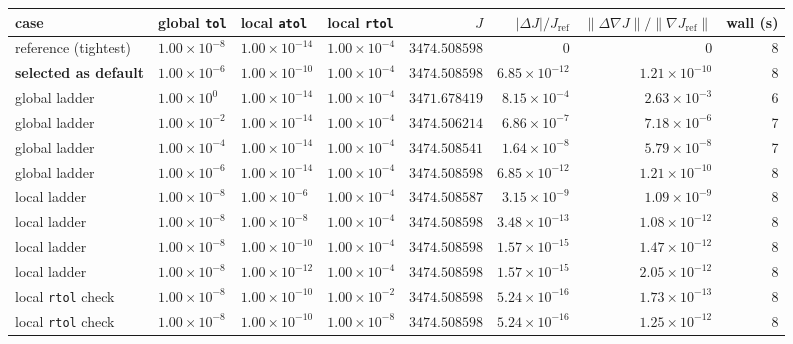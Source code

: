 \begin{tabular}{llllrrrr}
\toprule
case & global \texttt{tol} & local \texttt{atol} & local \texttt{rtol} & $J$ & $|\Delta J| / J_{\mathrm{ref}}$ & $\|\Delta \nabla J\| / \|\nabla J_{\mathrm{ref}}\|$ & wall (s) \\
\midrule
reference (tightest) & $1.00\times 10^{-8}$ & $1.00\times 10^{-14}$ & $1.00\times 10^{-4}$ & $3474.508598$ & $0$ & $0$ & 8 \\
\midrule
\textbf{selected as default} & $1.00\times 10^{-6}$ & $1.00\times 10^{-10}$ & $1.00\times 10^{-4}$ & $3474.508598$ & $6.85\times 10^{-12}$ & $1.21\times 10^{-10}$ & 8 \\
\midrule
global ladder & $1.00\times 10^{0}$ & $1.00\times 10^{-14}$ & $1.00\times 10^{-4}$ & $3471.678419$ & $8.15\times 10^{-4}$ & $2.63\times 10^{-3}$ & 6 \\
global ladder & $1.00\times 10^{-2}$ & $1.00\times 10^{-14}$ & $1.00\times 10^{-4}$ & $3474.506214$ & $6.86\times 10^{-7}$ & $7.18\times 10^{-6}$ & 7 \\
global ladder & $1.00\times 10^{-4}$ & $1.00\times 10^{-14}$ & $1.00\times 10^{-4}$ & $3474.508541$ & $1.64\times 10^{-8}$ & $5.79\times 10^{-8}$ & 7 \\
global ladder & $1.00\times 10^{-6}$ & $1.00\times 10^{-14}$ & $1.00\times 10^{-4}$ & $3474.508598$ & $6.85\times 10^{-12}$ & $1.21\times 10^{-10}$ & 8 \\
\midrule
local ladder & $1.00\times 10^{-8}$ & $1.00\times 10^{-6}$ & $1.00\times 10^{-4}$ & $3474.508587$ & $3.15\times 10^{-9}$ & $1.09\times 10^{-9}$ & 8 \\
local ladder & $1.00\times 10^{-8}$ & $1.00\times 10^{-8}$ & $1.00\times 10^{-4}$ & $3474.508598$ & $3.48\times 10^{-13}$ & $1.08\times 10^{-12}$ & 8 \\
local ladder & $1.00\times 10^{-8}$ & $1.00\times 10^{-10}$ & $1.00\times 10^{-4}$ & $3474.508598$ & $1.57\times 10^{-15}$ & $1.47\times 10^{-12}$ & 8 \\
local ladder & $1.00\times 10^{-8}$ & $1.00\times 10^{-12}$ & $1.00\times 10^{-4}$ & $3474.508598$ & $1.57\times 10^{-15}$ & $2.05\times 10^{-12}$ & 8 \\
\midrule
local \texttt{rtol} check & $1.00\times 10^{-8}$ & $1.00\times 10^{-10}$ & $1.00\times 10^{-2}$ & $3474.508598$ & $5.24\times 10^{-16}$ & $1.73\times 10^{-13}$ & 8 \\
local \texttt{rtol} check & $1.00\times 10^{-8}$ & $1.00\times 10^{-10}$ & $1.00\times 10^{-8}$ & $3474.508598$ & $5.24\times 10^{-16}$ & $1.25\times 10^{-12}$ & 8 \\
\bottomrule
\end{tabular}
